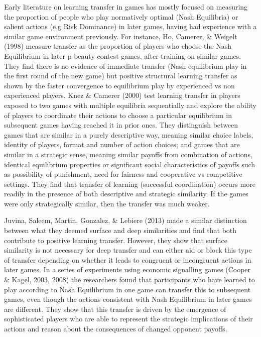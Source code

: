 \documentclass[man,floatsintext]{apa6}
\begin{document}
Early literature on learning transfer in games has mostly focused on measuring the proportion of people who play normatively optimal (Nash Equilibria) or salient actions (e.g Risk Dominance) in later games, having had experience with a similar game environment previously. For instance, Ho, Camerer, \& Weigelt (1998) measure transfer as the proportion of players who choose the Nash Equilibrium in later p-beauty contest games, after training on similar games. They find there is no evidence of immediate transfer (Nash equilibrium play in the first round of the new game) but positive structural learning transfer as shown by the faster convergence to equilibrium play by experienced vs non experienced players. Knez \& Camerer (2000) test learning transfer in players exposed to two games with multiple equilibria sequentially and explore the ability of players to coordinate their actions to choose a particular equilibrium in subsequent games having reached it in prior ones. They distinguish between games that are similar in a purely descriptive way, meaning similar choice labels, identity of players, format and number of action choices; and games that are similar in a strategic sense, meaning similar payoffs from combination of actions, identical equilibrium properties or significant social characteristics of payoffs such as possibility of punishment, need for fairness and cooperative vs competitive settings. They find that transfer of learning (successful coordination) occurs more readily in the presence of both descriptive and strategic similarity. If the games were only strategically similar, then the transfer was much weaker.

Juvina, Saleem, Martin, Gonzalez, \& Lebiere (2013) made a similar distinction between what they deemed surface and deep similarities and find that both contribute to positive learning transfer. However, they show that surface similarity is not necessary for deep transfer and can either aid or block this type of transfer depending on whether it leads to congruent or incongruent actions in later games. In a series of experiments using economic signalling games (Cooper \& Kagel, 2003, 2008) the researchers found that participants who have learned to play according to Nash Equilibrium in one game can transfer this to subsequent games, even though the actions consistent with Nash Equilibrium in later games are different. They show that this transfer is driven by the emergence of sophisticated players who are able to represent the strategic implications of their actions and reason about the consequences of changed opponent payoffs.
\end{document}
